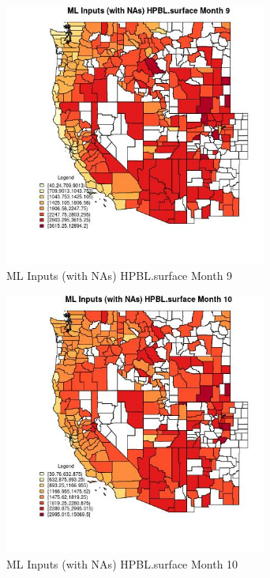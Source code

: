\begin{figure} 
\centering  
\includegraphics[width=0.77\textwidth]{Code_Outputs/Report_ML_input_PM25_Step4_part_e_de_duplicated_aves_compiled_2019-05-21wNAs_CountyHPBLsurfacemedianMonth9.jpg} 
\caption{\label{fig:Report_ML_input_PM25_Step4_part_e_de_duplicated_aves_compiled_2019-05-21wNAsCountyHPBLsurfacemedianMonth9}ML Inputs (with NAs) HPBL.surface Month 9} 
\end{figure} 
 

\begin{figure} 
\centering  
\includegraphics[width=0.77\textwidth]{Code_Outputs/Report_ML_input_PM25_Step4_part_e_de_duplicated_aves_compiled_2019-05-21wNAs_CountyHPBLsurfacemedianMonth10.jpg} 
\caption{\label{fig:Report_ML_input_PM25_Step4_part_e_de_duplicated_aves_compiled_2019-05-21wNAsCountyHPBLsurfacemedianMonth10}ML Inputs (with NAs) HPBL.surface Month 10} 
\end{figure} 
 

